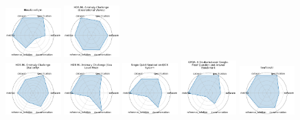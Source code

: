 \begin{figure}[ht!]
\includegraphics[width=0.1900\textwidth]{images/massspecgym_radar.pdf}
\includegraphics[width=0.1900\textwidth]{images/hdr_ml_anomaly_challenge_gravitational_waves_radar.pdf}
\\[1ex]
\includegraphics[width=0.1900\textwidth]{images/hdr_ml_anomaly_challenge_butterfly_radar.pdf}
\includegraphics[width=0.1900\textwidth]{images/hdr_ml_anomaly_challenge_sea_level_rise_radar.pdf}
\includegraphics[width=0.1900\textwidth]{images/single_qubit_readout_on_qick_system_radar.pdf}
\includegraphics[width=0.1900\textwidth]{images/gpqa_a_graduate-level_google-proof_question_and_answer_benchmark_radar.pdf}
\includegraphics[width=0.1900\textwidth]{images/seafloorai_radar.pdf}

\end{figure}
